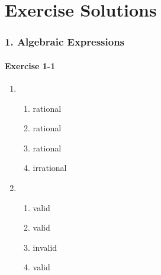 \chapter{Exercise Solutions}
\small{
\subsection*{1. Algebraic Expressions}
\begin{multicols}{3}
\subsubsection*{Exercise 1-1} %

\begin{enumerate}[noitemsep, label=\textbf{\arabic*}. ] 
  
\item %
  \begin{enumerate}[noitemsep, label=\textbf{(\alph*)} ] 
    \item rational
    \item rational
    \item rational
    \item irrational
    \end{enumerate}
\item %
    \begin{enumerate}[noitemsep, label=\textbf{(\alph*)} ] 
    \item valid
    \item valid
    \item invalid
    \item valid
    \end{enumerate}


\end{enumerate}
\end{multicols}}
